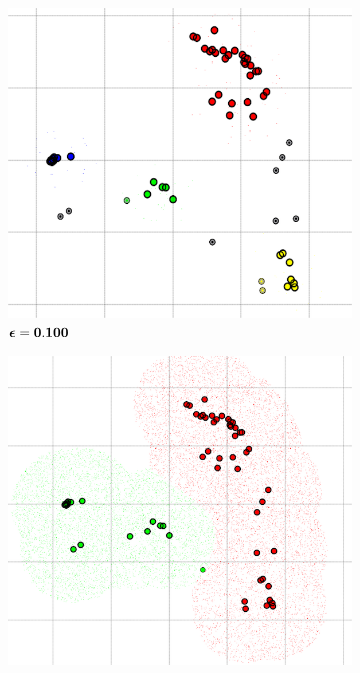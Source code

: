 \begin{figure} [ht]
\centering
	\begin{subfigure}[h]{0.30\textwidth}
    \centering
	\includegraphics[height=0.18\textheight]{./clustering/dbs_scan_eps_0100_min_3.png}
	\caption{$\boldsymbol \epsilon \bf= 0.100$}
	\end{subfigure}
    \begin{subfigure}[h]{0.30\textwidth}
    \centering
    \includegraphics[height=0.18\textheight]{./clustering/dbs_scan_eps_0230_min_3.png}

\end{subfigure}
\end{figure}
